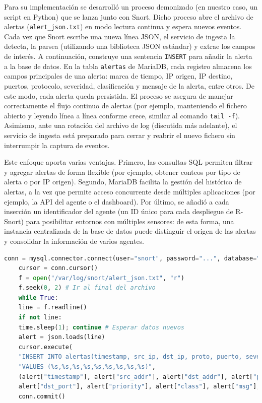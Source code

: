 \documentclass[11pt,a4paper,twoside]{report}
\begin{document}
Para su implementación se desarrolló un proceso demonizado (en nuestro caso, un script en Python) que se lanza junto con Snort. Dicho proceso abre el archivo de alertas (\texttt{alert\_json.txt}) en modo lectura continua y espera nuevos eventos. Cada vez que Snort escribe una nueva línea JSON, el servicio de ingesta la detecta, la parsea (utilizando una biblioteca JSON estándar) y extrae los campos de interés. A continuación, construye una sentencia \texttt{INSERT} para añadir la alerta a la base de datos. En la tabla \texttt{alertas} de MariaDB, cada registro almacena los campos principales de una alerta: marca de tiempo, IP origen, IP destino, puertos, protocolo, severidad, clasificación y mensaje de la alerta, entre otros. De este modo, cada alerta queda persistida. El proceso se asegura de manejar correctamente el flujo continuo de alertas (por ejemplo, manteniendo el fichero abierto y leyendo línea a línea conforme crece, similar al comando \texttt{tail -f}). Asimismo, ante una rotación del archivo de log (discutida más adelante), el servicio de ingesta está preparado para cerrar y reabrir el nuevo fichero sin interrumpir la captura de eventos.\newline

Este enfoque aporta varias ventajas. Primero, las consultas SQL permiten filtrar y agregar alertas de forma flexible (por ejemplo, obtener conteos por tipo de alerta o por IP origen). Segundo, MariaDB facilita la gestión del histórico de alertas, a la vez que permite acceso concurrente desde múltiples aplicaciones (por ejemplo, la API del agente o el dashboard). Por último, se añadió a cada inserción un identificador del agente (un ID único para cada despliegue de R-Snort) para posibilitar entornos con múltiples sensores: de esta forma, una instancia centralizada de la base de datos puede distinguir el origen de las alertas y consolidar la información de varios agentes.

\begin{lstlisting}[language=Python, caption={Esquema simplificado del servicio de ingesta de alertas}, label={lst:ingest}]
	conn = mysql.connector.connect(user="snort", password="...", database="snortDB") #Implementación real con variables de entorno
	cursor = conn.cursor()
	f = open("/var/log/snort/alert_json.txt", "r")
	f.seek(0, 2) # Ir al final del archivo
	while True:
	line = f.readline()
	if not line:
	time.sleep(1); continue # Esperar datos nuevos
	alert = json.loads(line)
	cursor.execute(
	"INSERT INTO alertas(timestamp, src_ip, dst_ip, proto, puerto, severidad, clase, mensaje, agente_id) "
	"VALUES (%s,%s,%s,%s,%s,%s,%s,%s,%s)",
	(alert["timestamp"], alert["src_addr"], alert["dst_addr"], alert["proto"],
	alert["dst_port"], alert["priority"], alert["class"], alert["msg"], AGENTE_ID))
	conn.commit()
\end{lstlisting}
\end{document}
